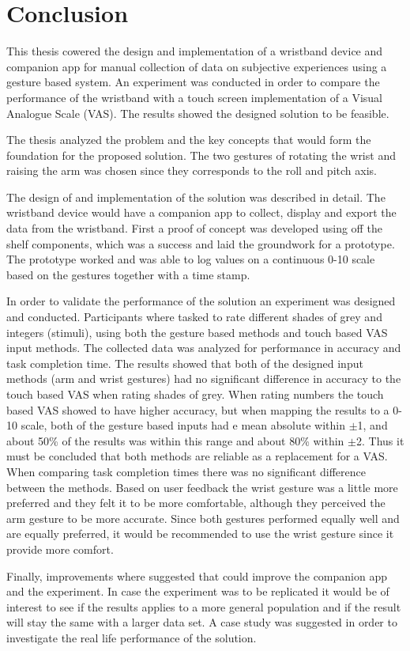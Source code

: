\chapter{Conclusion}\label{con_ch}
This thesis cowered the design and implementation of a wristband device and companion app for manual collection of data on subjective experiences using a gesture based system. An experiment was conducted in order to compare the performance of the wristband with a touch screen implementation of a Visual Analogue Scale (VAS). The results showed the designed solution to be feasible.

The thesis analyzed the problem and the key concepts that would form the foundation for the proposed solution. The two gestures of rotating the wrist and raising the arm was chosen since they corresponds to the roll and pitch axis.

The design of and implementation of the solution was described in detail. The wristband device would have a companion app to collect, display and export the data from the wristband. First a proof of concept was developed using off the shelf components, which was a success and laid the groundwork for a prototype. The prototype worked and was able to log values on a continuous 0-10 scale based on the gestures together with a time stamp.

In order to validate the performance of the solution an experiment was designed and conducted. Participants where tasked to rate different shades of grey and integers (stimuli), using both the gesture based methods and touch based VAS input methods. The collected data was analyzed for performance in accuracy and task completion time. The results showed that both of the designed input methods (arm and wrist gestures) had no significant difference in accuracy to the touch based VAS when rating shades of grey. When rating numbers the touch based VAS showed to have higher accuracy, but when mapping the results to a 0-10 scale, both of the gesture based inputs had e mean absolute within $\pm$1, and about 50\% of the results was within this range and about 80\% within $\pm$2. Thus it must be concluded that both methods are reliable as a replacement for a VAS. When comparing task completion times there was no significant difference between the methods. Based on user feedback the wrist gesture was a little more preferred and they felt it to be more comfortable, although they perceived the arm gesture to be more accurate. Since both gestures performed equally well and are equally preferred, it would be recommended to use the wrist gesture since it provide more comfort.

Finally, improvements where suggested that could improve the companion app and the experiment. In case the experiment was to be replicated it would be of interest to see if the results applies to a more general population and if the result will stay the same with a larger data set. A case study was suggested in order to investigate the real life performance of the solution.